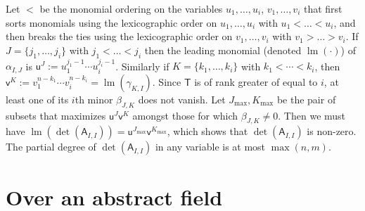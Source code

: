 \documentclass[sigconf]{acmart}
\newcommand{\vu}{\ensuremath{\mathsf{u}}}
\newcommand{\vv}{\ensuremath{\mathsf{v}}}
\newcommand{\mA}{\ensuremath{\mathsf{A}}}
\newcommand{\mT}{\ensuremath{\mathsf{T}}}
\newcommand{\lm}{\ensuremath{\operatorname{lm}}}
\newcommand{\todo}[1]{(\textbf{todo:} #1)}
\theoremstyle{acmdefinition}
\begin{document}
Let $<$ be the monomial ordering on the variables $u_1,\dots,u_i$,
$v_1,\dots,v_i$ that first sorts monomials using the lexicographic order on
$u_1,\dots,u_i$ with $u_1 < \dots < u_i$, and then breaks the ties using the
lexicographic order on $v_1,\dots,v_i$ with $v_1 > \dots > v_i$. If
$J=\{j_1,\dots,j_i\}$ with $j_1 < \dots < j_i$ then the leading monomial
(denoted $\lm(\cdot)$) of $\alpha_{I,J}$ is
$\vu^J := u_1^{j_1-1} \cdots u_i^{j_i-1}$.  Similarly if $K=\{k_1,\dots,k_i\}$
with $k_1 < \cdots < k_i$, then
$\vv^K := v_1^{n-k_1} \cdots v_i^{n-k_i}=\lm(\gamma_{K,I})$. Since $\mT$ is of
rank greater of equal to $i$, at least one of its $i$th minor $\beta_{J,K}$ does
not vanish. Let $J_{\max},K_{\max}$ be the pair of subsets that maximizes
$\vu^J \vv^K$ amongst those for which $\beta_{J,K} \neq 0$. Then we must have
$\lm(\det(\mA_{I,I})) = \vu^{J_{\max}} \vv^{K_{\max}}$, which shows that
$\det(\mA_{I,I})$ is non-zero. The partial degree of $\det(\mA_{I,I})$ in any variable
 is at most $\max(n,m)$. 



\vspace{-5px}
\section{Over an abstract field}\label{sec:abstract}
\end{document}
